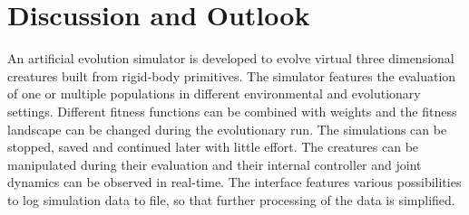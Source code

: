 \documentclass[main]{subfiles}
\begin{document}
\setcounter{chapter}{4}

\chapter{Discussion and Outlook} %

\label{Chapter\thechapter} %

%
An artificial evolution simulator is developed to evolve virtual three dimensional creatures built from rigid-body primitives. %
%
The simulator features the evaluation of one or multiple populations in different environmental and evolutionary settings. %
%
Different fitness functions can be combined with weights and the fitness landscape can be changed during the evolutionary run. %
%
The simulations can be stopped, saved and continued later with little effort. %
%
The creatures can be manipulated during their evaluation and their internal controller and joint dynamics can be observed in real-time. %
%
The interface features various possibilities to log simulation data to file, so that further processing of the data is simplified. %
\end{document}
